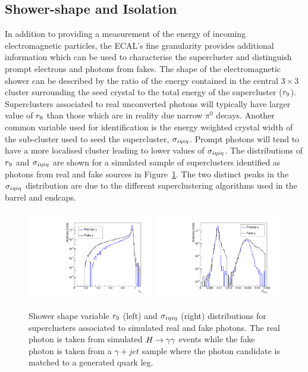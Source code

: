 \subsection{Shower-shape and Isolation}
In addition to providing a measurement of the energy of incoming electromagnetic particles,
the ECAL's fine granularity provides additional information which can be used to characterise
the supercluster and distinguish prompt electrons and photons from fakes.  
The shape of the electromagnetic shower can be described by the ratio of the energy contained
in the central $3\times3$ cluster surrounding the seed crystal to the total energy of the supercluster
($r_{9}$). Superclusters associated to real unconverted photons will typically have larger value of 
$r_{9}$ than those which are in reality due narrow $\pi^{0}$ decays. Another common variable used
for identification is the energy weighted crystal width of the sub-cluster used to seed the supercluster,
$\sigma_{i\eta i\eta}$. Prompt photons will tend to have a more localised cluster leading to lower values of $\sigma_{i\eta i\eta}$. 
The distributions of $r_{9}$ and $\sigma_{i\eta i\eta}$ are shown for a simulated sample of 
superclusters identified as photons from real and fake sources in Figure~\ref{fig:showershape}.
The two distinct peaks in the $\sigma_{i\eta i\eta}$ distribution are due to the different superclustering algorithms 
used in the barrel and endcaps.

\begin{figure}[hbt!]
\begin{center}
	\includegraphics[width=0.49\textwidth]{detector/r9eg.pdf}
	\includegraphics[width=0.49\textwidth]{detector/sieieeg.pdf}
	\caption{Shower shape variable $r_{9}$ (left) and $\sigma_{i\eta i\eta}$ (right) distributions 
	for superclusters associated to simulated real and fake photons. The real photon is taken
	from simulated $H\rightarrow\gamma\gamma$ events while the fake photon is taken from a $\gamma+jet$ sample
	where the photon candidate is matched to a generated quark leg.}
	\label{fig:showershape}
\end{center}
\end{figure}

